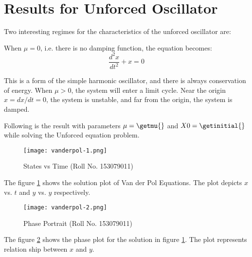 \documentclass[12pt, a4paper]{article}
\begin{document}
\section{Results for Unforced Oscillator}
Two interesting regimes for the characteristics of the unforced oscillator are:

When $\mu = 0$, i.e. there is no damping function, the equation becomes:
\begin{equation} \label{simple}
\frac{d^2x}{dt^2} + x = 0
\end{equation}

This is a form of the simple harmonic oscillator, and there is always conservation of energy.
When $\mu > 0$, the system will enter a limit cycle. Near the origin $x = dx/dt = 0$, the system is unstable, and far from the origin, the system is damped.

Following is the result with parameters $\mu = \getmu{}$ and $X0 = \getinitial{}$ while solving the Unforced equation problem.
\begin{figure}[H]
\centering
\texttt{[image: vanderpol-1.png]}
\caption{States vs Time (Roll No. 153079011)}
\label{fig:states}
\end{figure}

The figure \ref{fig:states} shows the solution plot of Van der Pol Equations. The plot depicts $x$ vs. $t$ and $y$ vs. $y$ respectively.

\begin{figure}[H]
\centering
\texttt{[image: vanderpol-2.png]}
\caption{Phase Portrait (Roll No. 153079011)}
\label{fig:phase}
\end{figure}

The figure \ref{fig:phase} shows the phase plot for the solution in figure \ref{fig:states}. The plot represents relation ship between $x$ and $y$.



\end{document}
